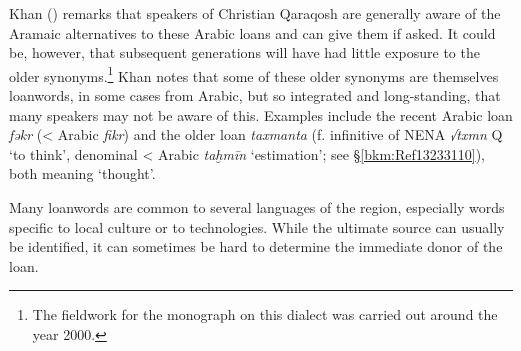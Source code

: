 \documentclass[output=paper]{langsci/langscibook}
\begin{document}
Khan (\citeyear[516]{Khan2002}) remarks that speakers of Christian Qaraqosh are generally aware of the Aramaic alternatives to these Arabic loans and can give them if asked. It could be, however, that subsequent generations will have had little exposure to the older synonyms.\footnote{The fieldwork for the monograph on this dialect was carried out around the year 2000.} Khan notes that some of these older synonyms are themselves loanwords, in some cases from Arabic, but so integrated and long-standing, that many speakers may not be aware of this. Examples include the recent Arabic loan \textit{fəkr} (< Arabic \textit{fikr}) and the older loan \textit{taxmanta} (f. infinitive of NENA \textit{√txmn} Q ‘to think’, denominal < Arabic \textit{taḫmīn} ‘estimation’; see §\ref{bkm:Ref13233110}), both meaning ‘thought’.

Many loanwords are common to several languages of the region, especially words specific to local culture or to technologies. While the ultimate source can usually be identified, it can sometimes be hard to determine the immediate donor of the loan. 
\end{document}
